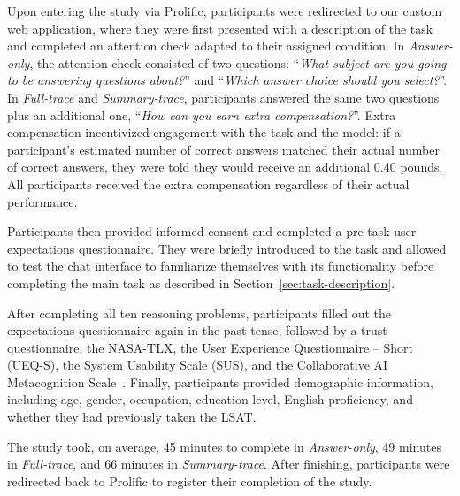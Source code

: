 \documentclass[manuscript,review,anonymous]{acmart}
\begin{document}
Upon entering the study via Prolific, participants were redirected to our custom web application, where they were first presented with a description of the task and completed an attention check adapted to their assigned condition. In \textit{Answer-only}, the attention check consisted of two questions: ``\textit{What subject are you going to be answering questions about?}'' and ``\textit{Which answer choice should you select?}''. In \textit{Full-trace} and \textit{Summary-trace}, participants answered the same two questions plus an additional one, ``\textit{How can you earn extra compensation?}''. Extra compensation incentivized engagement with the task and the model: if a participant's estimated number of correct answers matched their actual number of correct answers, they were told they would receive an additional 0.40 pounds. All participants received the extra compensation regardless of their actual performance.

Participants then provided informed consent and completed a pre-task user expectations questionnaire. They were briefly introduced to the task and allowed to test the chat interface to familiarize themselves with its functionality before completing the main task as described in Section~\ref{sec:task-description}.

After completing all ten reasoning problems, participants filled out the expectations questionnaire again in the past tense, followed by a trust questionnaire, the NASA-TLX, the User Experience Questionnaire -- Short (UEQ-S), the System Usability Scale (SUS), and the Collaborative AI Metacognition Scale~\cite{Sidra03042026}. Finally, participants provided demographic information, including age, gender, occupation, education level, English proficiency, and whether they had previously taken the LSAT.

The study took, on average, 45 minutes to complete in \textit{Answer-only}, 49 minutes in \textit{Full-trace}, and 66 minutes in \textit{Summary-trace}. After finishing, participants were redirected back to Prolific to register their completion of the study.

\end{document}
